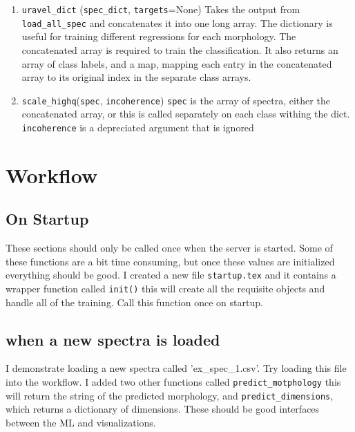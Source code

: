 \documentclass{article}
\begin{document}
\begin{enumerate}
\item \texttt{uravel\_dict} (\texttt{spec\_dict}, \texttt{targets}=None)
Takes the output from \texttt{load\_all\_spec} and concatenates it into one long array. The dictionary is useful for training different regressions for each morphology. The concatenated array is required to train the classification.
It also returns an array of class labels, and a map, mapping each entry in the concatenated array to its original index in the separate class arrays.
\item \texttt{scale\_highq}(\texttt{spec}, \texttt{incoherence})
\texttt{spec} is the array of spectra, either the concatenated array, or this is called separately on each class withing the dict.
\texttt{incoherence} is a depreciated argument that is ignored
\end{enumerate}

\section{Workflow}
\subsection{On Startup}
These sections should only be called once when the server is started. Some of these functions are a bit time consuming, but once these values are initialized everything should be good.
I created a new file \texttt{startup.tex} and it contains a wrapper function called \texttt{init()} this will create all the requisite objects and handle all of the training. 
Call this function once on startup.

\subsection{when a new spectra is loaded}
I demonstrate loading a new spectra called 'ex\_spec\_1.csv'. Try loading this file into the workflow.
I added two other functions called \texttt{predict\_motphology} this will return the string of the predicted morphology, and \texttt{predict\_dimensions}, which returns a dictionary of dimensions.
These should be good interfaces between the ML and visualizations.
\end{document}
